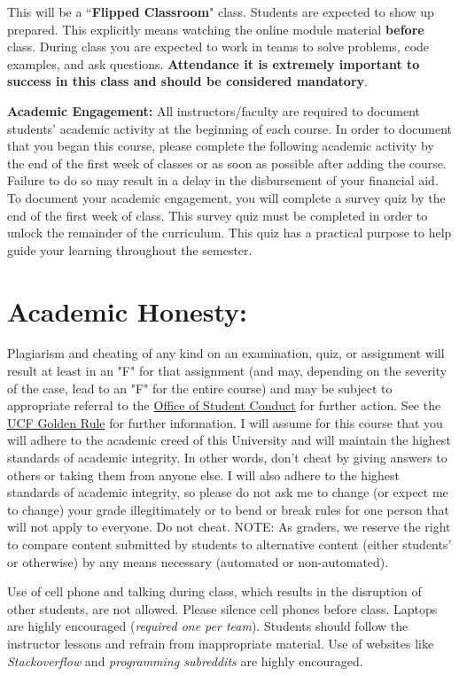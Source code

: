 \documentclass[paper=letter, fontsize=12pt]{article}
\begin{document}
 This will be a ``\textbf{Flipped Classroom}" class. Students are expected to show up prepared. This explicitly means watching the online module material \textbf{before} class. During class you are expected to work in teams to solve problems, code examples, and ask questions. \textbf{Attendance it is extremely important to success in this class and should be considered mandatory}.


\textcolor{myRed}{\textbf{Academic Engagement:}} All instructors/faculty are required to document students' academic activity at the beginning of each course. In order to
document that you began this course, please complete the following academic activity by the end of the first week of classes or as soon as possible after adding the course. Failure to do so may result in a delay in the disbursement of your
financial aid. To document your academic engagement, you will complete a survey quiz by the end of the first week of class. This survey quiz must be completed in order to unlock the remainder of the curriculum. This quiz has a practical purpose to help guide your learning throughout the semester.

\section{Academic Honesty:}
Plagiarism and cheating of any kind on an examination, quiz, or assignment will result at least in an "F" for that assignment (and may, depending on the severity of the case, lead to an "F" for the entire course) and may be subject to appropriate referral to the \href{http://osc.sdes.ucf.edu/faq#students}{Office of Student Conduct} for further action. See the \href{http://goldenrule.sdes.ucf.edu/}{UCF Golden Rule} for further information. I will assume for this course that you will adhere to the academic creed of this University and will maintain the highest standards of academic integrity. In other words, don't cheat by giving answers to others or taking them from anyone else. I will also adhere to the highest standards of academic integrity, so please do not ask me to change (or expect me to change) your grade illegitimately or to bend or break rules for one person that will not apply to everyone. Do not cheat. NOTE: As graders, we reserve the right to compare content submitted by students to alternative content
(either students’ or otherwise) by any means necessary (automated or non-automated).


Use of cell phone and talking during class, which results in the disruption of other students, are not allowed. Please silence cell phones before class. Laptops are highly encouraged (\textit{required one per team}). Students should follow the instructor lessons and refrain from inappropriate material. Use of websites like \textit{Stackoverflow} and \textit{programming subreddits} are highly encouraged.
\end{document}

